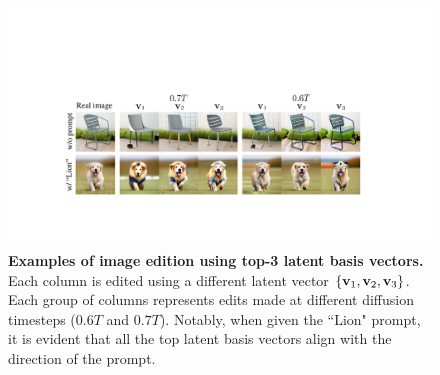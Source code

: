 \begin{figure}[!t]
    \centering
    \includegraphics[width=1\linewidth]{figure/given_text_vk.pdf}
    \vspace{-1.5em}
    \caption{
    \textbf{{Examples of image edition using top-3 latent basis vectors.}} 
    {Each column is edited using a} different latent vector 
    $\{ \mathbf{v}_1, \mathbf{v}_2, \mathbf{v}_3\}$. %
    Each group of columns {represents edits made} at different diffusion timesteps ($0.6T$ and $0.7T$).
    {Notably, when} given the ``Lion" prompt, {it is evident that all the top latent basis vectors align with the direction of the prompt.}
    }
    \vspace{-0.5em}
    \label{fig:local_basis_text_vk}
\end{figure}

